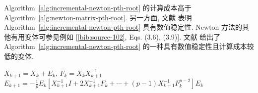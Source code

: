 {Algorithm~\ref{alg:incremental-newton-pth-root} 的计算成本高于 Algorithm~\ref{alg:newton-matrix-pth-root}. 另一方面, 文献  表明 Algorithm~\ref{alg:incremental-newton-pth-root} 具有数值稳定性. Newton 方法的其他有用变体可参见例如 [\hyperref[bib:source-102]{\ref*{bib:source-102}}, Eqs. (3.6), (3.9)]. 文献  给出了 Algorithm~\ref{alg:incremental-newton-pth-root} 的一种具有数值稳定性且计算成本较低的变体.}

\begin{algorithm}[H]\caption{{(迭代法) 求 $A^{1/p}$ 的增量 Newton 方法}}\label{alg:incremental-newton-pth-root}\begin{algorithmic}[1]
\State $X_{k+1}=X_k+E_k$, $F_k=X_kX_{k+1}^{-1}$
\State $E_{k+1}=-\frac{1}{p}E_k\left[X_{k+1}^{-1}I+2X_{k+1}^{-1}F_k+\cdots+(p-1)X_{k+1}^{-1}F_k^{p-2}\right]E_k$
\EndFor
\end{algorithmic}\end{algorithm}
